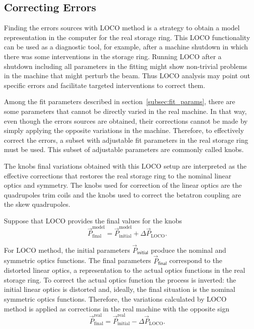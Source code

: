 \subsection{Correcting Errors}
Finding the errors sources with LOCO method is a strategy to obtain a model representation in the computer for the real storage ring. This LOCO functionality can be used as a diagnostic tool, for example, after a machine shutdown in which there was some interventions in the storage ring. Running LOCO after a shutdown including all parameters in the fitting might show non-trivial problems in the machine that might perturb the beam. Thus LOCO analysis may point out specific errors and facilitate targeted interventions to correct them.

Among the fit parameters described in section~\ref{subsec:fit_params}, there are some parameters that cannot be directly varied in the real machine. In that way, even though the errors sources are obtained, their corrections cannot be made by simply applying the opposite variations in the machine. Therefore, to effectively correct the errors, a subset with adjustable fit parameters in the real storage ring must be used. This subset of adjustable parameters are commonly called knobs.

The knobs final variations obtained with this LOCO setup are interpreted as the effective corrections that restores the real storage ring to the nominal linear optics and symmetry. The knobs used for correction of the linear optics are the quadrupoles trim coils and the knobs used to correct the betatron coupling are the skew quadrupoles. 

Suppose that LOCO provides the final values for the knobs
\begin{equation}
    \vec{P}_{\mathrm{final}}^{\mathrm{model}} = \vec{P}_{\mathrm{initial}}^{\mathrm{model}} + \Delta\vec{P}_{\mathrm{LOCO}}.
\end{equation}

For LOCO method, the initial parameters $\vec{P}_{\mathsf{initial}}$ produce the nominal and symmetric optics functions. The final parameters $\vec{P}_{\mathsf{final}}$ correspond to the distorted linear optics, a representation to the actual optics functions in the real storage ring. To correct the actual optics function the process is inverted: the initial linear optics is distorted and, ideally, the final situation is the nominal symmetric optics functions. Therefore, the variations calculated by LOCO method is applied as corrections in the real machine with the opposite sign
\begin{equation}
    \vec{P}_{\mathrm{final}}^{\mathrm{real}} = \vec{P}_{\mathrm{initial}}^{\mathrm{real}} - \Delta\vec{P}_{\mathrm{LOCO}}.
\end{equation}
